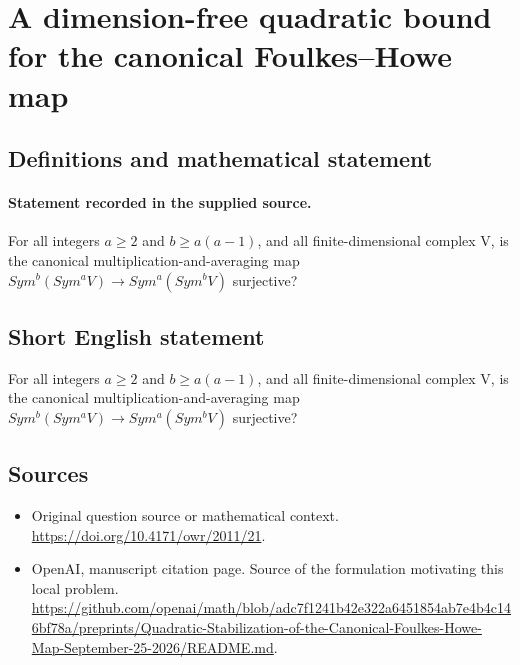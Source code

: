 \documentclass[11pt]{article}
\begin{document}
\section*{A dimension-free quadratic bound for the canonical Foulkes–Howe map}\label{30006992}
\subsection{Definitions and mathematical statement}
\paragraph{Statement recorded in the supplied source.}
For all integers $a\geq 2$ and $b\geq a(a-1)$, and all finite-dimensional complex V, is the canonical multiplication-and-averaging map $Sym^{b}(Sym^{a}V)\to Sym^{a}(Sym^{b}V)$ surjective?
\subsection{Short English statement}
For all integers $a\geq 2$ and $b\geq a(a-1)$, and all finite-dimensional complex V, is the canonical multiplication-and-averaging map $Sym^{b}(Sym^{a}V)\to Sym^{a}(Sym^{b}V)$ surjective?
\subsection{Sources}
\begin{itemize}
\item[S1] Original question source or mathematical context.
\url{https://doi.org/10.4171/owr/2011/21}.
\item[S2] OpenAI, manuscript citation page. Source of the formulation motivating this local problem.
\url{https://github.com/openai/math/blob/adc7f1241b42e322a6451854ab7e4b4c146bf78a/preprints/Quadratic-Stabilization-of-the-Canonical-Foulkes-Howe-Map-September-25-2026/README.md}.
\end{itemize}
\end{document}
